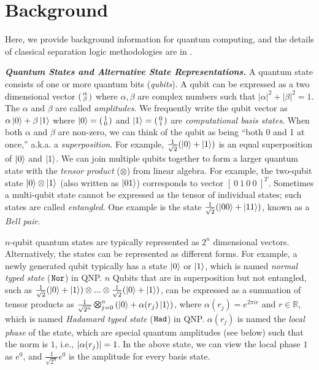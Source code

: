 \section{Background}
\label{sec:background}

Here, we provide background information for quantum computing, and the details of classical separation logic methodologies are in . 

\noindent\textbf{\textit{Quantum States and Alternative State Representations.}} A quantum state consists of one or more quantum bits (\emph{qubits}). A qubit can be expressed as a two dimensional vector $\begin{psmallmatrix} \alpha \\ \beta \end{psmallmatrix}$ where $\alpha,\beta$ are complex numbers such that $|\alpha|^2 + |\beta|^2 = 1$.  The $\alpha$ and $\beta$ are called \emph{amplitudes}. 
%
We frequently write the qubit vector as $\alpha\left\vert{0}\right\rangle + \beta\left\vert{1}\right\rangle$ where $\left\vert{0}\right\rangle = \begin{psmallmatrix} 1 \\ 0 \end{psmallmatrix}$ and $\left\vert{1}\right\rangle = \begin{psmallmatrix} 0 \\ 1 \end{psmallmatrix}$ are \emph{computational basis states}. When both $\alpha$ and $\beta$ are non-zero, we can think of the qubit as being ``both 0 and 1 at once,'' a.k.a. a \emph{superposition}. For example, $\frac{1}{\sqrt{2}}(\left\vert{0}\right\rangle + \left\vert{1}\right\rangle)$ is an equal superposition of $\left\vert{0}\right\rangle$ and $\left\vert{1}\right\rangle$. 
We can join multiple qubits together to form a larger quantum state with the \emph{tensor product} ($\otimes$) from linear algebra. For example, the two-qubit state $\left\vert{0}\right\rangle \otimes \left\vert{1}\right\rangle$ (also written as $\left\vert{01}\right\rangle$) corresponds to vector $[~0~1~0~0~]^T$. 
Sometimes a multi-qubit state cannot be expressed as the tensor of individual states; such states are called \emph{entangled}. One example is the state $\frac{1}{\sqrt{2}}(\left\vert{00}\right\rangle + \left\vert{11}\right\rangle)$, known as a \emph{Bell pair}.

$n$-qubit quantum states are typically represented as $2^n$ dimensional vectors. Alternatively, the states can be represented as different forms. For example, a newly generated qubit typically has a state $\left\vert{0}\right\rangle$ or $\left\vert{1}\right\rangle$, which is named \textit{normal typed state} ($\texttt{Nor}$) in QNP. $n$ Qubits that are in superposition but not entangled, such as $\frac{1}{\sqrt{2}}(\left\vert{0}\right\rangle + \left\vert{1}\right\rangle)\otimes ... \otimes \frac{1}{\sqrt{2}}(\left\vert{0}\right\rangle + \left\vert{1}\right\rangle)$, can be expressed as a summation of tensor products as $\shad{2^n}{n}{\alpha(r_j)}$, where $\alpha(r_j)=e^{2\pi i r}$ and $r \in \mathbb{R}$, which is named \textit{Hadamard typed state} ($\texttt{Had}$) in QNP.
$\alpha(r_j)$ is named the \emph{local phase} of the state, which are special quantum amplitudes (see below) such that the norm is $1$, i.e., $|\alpha(r_j)|=1$. In the above state, we can view the local phase $1$ as $e^{0}$, and $\frac{1}{\sqrt{2^n}}e^{0}$ is the amplitude for every basis state.


